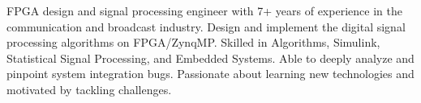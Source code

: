 \par{
    FPGA design and signal processing engineer with 7+ years of experience in the communication
    and broadcast industry. Design and implement the digital signal processing algorithms on FPGA/ZynqMP.
    Skilled in Algorithms, Simulink, Statistical Signal Processing, and Embedded Systems.
    Able to deeply analyze and pinpoint system integration bugs. Passionate about learning
    new technologies and motivated by tackling challenges.
    \\
}
